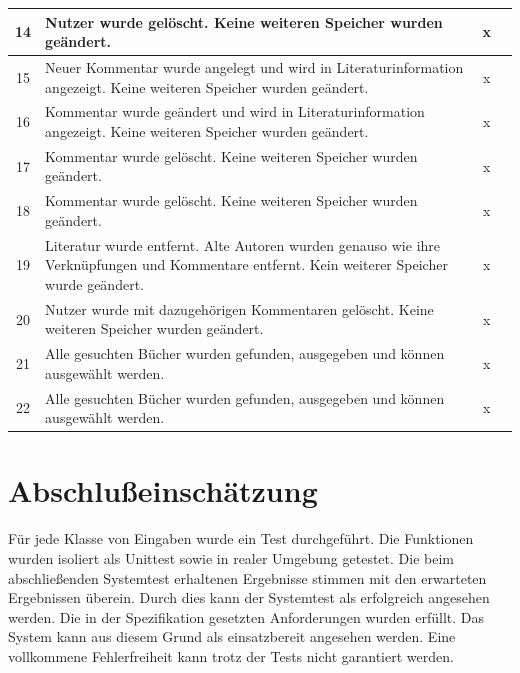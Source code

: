 \begin{longtable}{|c|p{8cm}|c|c|}
14 & Nutzer wurde gelöscht. Keine weiteren Speicher wurden geändert. & x &  \\\hline
15 & Neuer Kommentar wurde angelegt und wird in Literaturinformation angezeigt. Keine weiteren Speicher wurden geändert. & x &  \\\hline
16 & Kommentar wurde geändert und wird in Literaturinformation angezeigt. Keine weiteren Speicher wurden geändert. & x &  \\\hline
17 & Kommentar wurde gelöscht. Keine weiteren Speicher wurden geändert. & x &  \\\hline
18 & Kommentar wurde gelöscht. Keine weiteren Speicher wurden geändert. & x &  \\\hline
19 & Literatur wurde entfernt. Alte Autoren wurden genauso wie ihre Verknüpfungen und Kommentare entfernt. Kein weiterer Speicher wurde geändert. & x &  \\\hline
20 & Nutzer wurde mit dazugehörigen Kommentaren gelöscht. Keine weiteren Speicher wurden geändert. & x &  \\\hline
21 & Alle gesuchten Bücher wurden gefunden, ausgegeben und können ausgewählt werden. & x &  \\\hline
22 & Alle gesuchten Bücher wurden gefunden, ausgegeben und können ausgewählt werden. & x &  \\\hline
\end{longtable}

\section{Abschlußeinschätzung}
Für jede Klasse von Eingaben wurde ein Test durchgeführt. Die Funktionen wurden isoliert als Unittest sowie in realer Umgebung getestet. Die beim abschließenden Systemtest erhaltenen Ergebnisse stimmen mit den erwarteten Ergebnissen überein. Durch dies kann der Systemtest als erfolgreich angesehen werden. Die in der Spezifikation gesetzten Anforderungen wurden erfüllt. Das System kann aus diesem Grund als einsatzbereit angesehen werden. Eine vollkommene Fehlerfreiheit kann trotz der Tests nicht garantiert werden.
